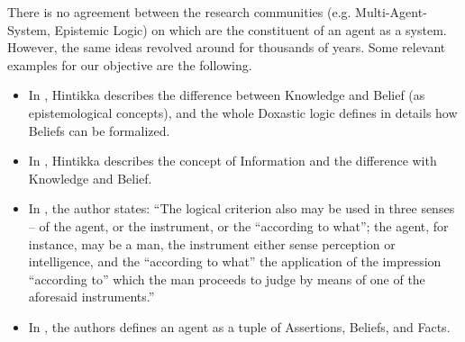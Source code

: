 There is no agreement between the research communities (e.g.
Multi-Agent-System, Epistemic Logic) on which are the constituent of an agent
as a system. However, the same ideas revolved around for thousands of years.
Some relevant examples for our objective are the following.
\begin{itemize}
	\item In \autocite{Hintikka1962knowledge}, Hintikka describes the
		difference between Knowledge and Belief (as epistemological
		concepts), and the whole Doxastic logic defines in details how
		Beliefs can be formalized.
	\item In \autocite{Hintikka1993Information}, Hintikka describes the concept
		of Information and the difference with Knowledge and Belief.
	\item In \autocite{Empiricus1990Pyrrhonism}, the author states: ``The
		logical criterion also may be used in three senses -- of the
		agent, or the instrument, or the ``according to what''; the
		agent, for instance, may be a man, the instrument either sense
		perception or intelligence, and the ``according to what'' the
		application of the impression ``according to'' which the man
		proceeds to judge by means of one of the aforesaid
		instruments.'' 
	\item In \autocite{Santaca2016abf}, the authors defines an agent as a
		tuple of Assertions, Beliefs, and Facts.
\end{itemize}

